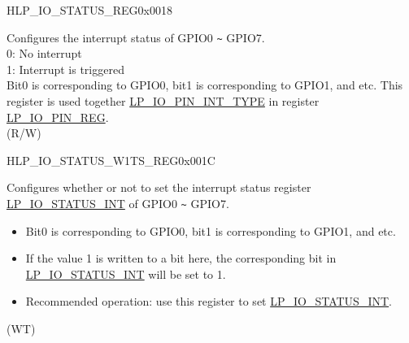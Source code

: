 \begin{register}{H}{LP\_IO\_STATUS\_REG}{0x0018}\label{regdesc:LPIOSTATUSREG}
%
%
\regnewline%
\begin{regdesc}\begin{reglist}
\label{fielddesc:LPIOSTATUSINT}\item [LP\_GPIO\_STATUS\_INT] Configures the interrupt status of GPIO0 \verb+~+ GPIO7.\\
0: No interrupt\\
1: Interrupt is triggered\\
Bit0 is corresponding to GPIO0, bit1 is corresponding to GPIO1, and etc. This register is used together \hyperref[fielddesc:LPIOPINNINTTYPE]{LP\_IO\_PIN\_INT\_TYPE} in register \hyperref[regdesc:LPIOPINNREG]{LP\_IO\_PIN\_REG}.\\
 (R/W)
\end{reglist}\end{regdesc}
\end{register}


\begin{register}{H}{LP\_IO\_STATUS\_W1TS\_REG}{0x001C}\label{regdesc:LPIOSTATUSW1TSREG}
%
%
\regnewline%
\begin{regdesc}\begin{reglist}
\label{fielddesc:LPIOSTATUSINTW1TS}\item [LP\_GPIO\_STATUS\_INT\_W1TS] Configures whether or not to set the interrupt status register \hyperref[fielddesc:LPIOSTATUSINT]{LP\_IO\_STATUS\_INT} of GPIO0 \verb+~+ GPIO7.\\
\begin{itemize}
    \item Bit0 is corresponding to GPIO0, bit1 is corresponding to GPIO1, and etc.
    \item If the value 1 is written to a bit here, the corresponding bit in \hyperref[fielddesc:LPIOSTATUSINT]{LP\_IO\_STATUS\_INT} will be set to 1.
    \item Recommended operation: use this register to set \hyperref[fielddesc:LPIOSTATUSINT]{LP\_IO\_STATUS\_INT}. \end{itemize} (WT)
\end{reglist}\end{regdesc}
\end{register}


